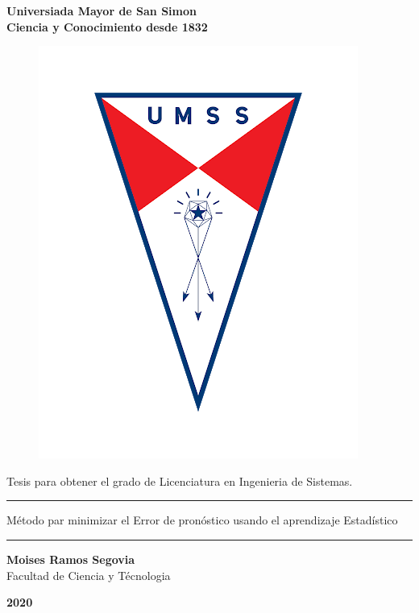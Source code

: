 \begin{titlepage}
	\begin{center}
		{\LARGE \textbf {Universiada Mayor de San Simon}}\\
		\vspace{0.25cm}
		{\large \textbf{Ciencia y Conocimiento desde 1832}}
		\vspace{0.25cm}
		\begin{figure}[h]
			\centering
			\includegraphics[scale=0.25]{imagenes/logo-umss.png}
		\end{figure}
	
		\vspace{1cm}
		
		{\large Tesis para obtener el grado de Licenciatura en Ingenieria de Sistemas.}
		
		\vspace{0.5cm}
		\rule{165mm}{0.5mm}
		\vspace{2mm}
		\begin{spacing}{1.5}
			{\large Método par minimizar el Error de pronóstico usando el aprendizaje Estadístico}
		\end{spacing}	
		\vspace{1mm}
		\rule{165mm}{0.5mm}
		
		\vspace{2cm}
		
		{\Large \textbf{Moises Ramos Segovia}}\\
		\vspace{5mm}
		{\Large Facultad de Ciencia y Técnologia}\\
		\vfill
		
		{\Huge \textbf{2020}}
	\end{center}
\end{titlepage}